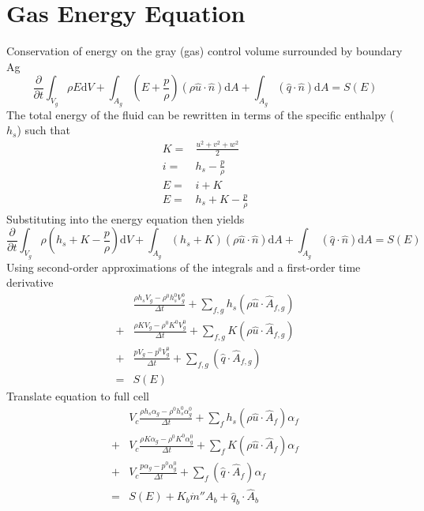 \documentclass{article}
\renewcommand{\vec}[1]{\ensuremath{\hat{#1}}}
\renewcommand{\d}{\mathrm{d}}
\begin{document}
  \section{Gas Energy Equation}
    Conservation of energy on the gray (gas) control volume surrounded by boundary Ag
    \begin{equation*}
        \frac{\partial}{\partial t}\int_{V_g} \rho E \d V
      + \int_{A_g} (E + \frac{p}{\rho}) (\rho \vec{u} \cdot \vec{n}) \d A
      + \int_{A_g} (\vec{q} \cdot \vec{n}) \d A
      = S(E)
    \end{equation*}
    The total energy of the fluid can be rewritten in terms of the specific enthalpy ($h_s$) such that
    \begin{align*}
      K =& \frac{u^2 + v^2 + w^2}{2} \\
      i =& h_s - \frac{p}{\rho} \\
      E =& i + K \\
      E =& h_s + K - \frac{p}{\rho}
    \end{align*}
    Substituting into the energy equation then yields
    \begin{equation*}
          \frac{\partial}{\partial t}\int_{V_g} \rho (h_s + K - \frac{p}{\rho}) \d V
        + \int_{A_g} (h_s + K) (\rho \vec{u} \cdot \vec{n}) \d A
        + \int_{A_g} (\vec{q} \cdot \vec{n}) \d A
        = S(E)
    \end{equation*}
    Using second-order approximations of the integrals and a first-order time derivative
    \begin{align*}
        &\frac{\rho h_s V_g - \rho^0 h_s^0 V_g^0}{\Delta t}
      + \sum_{f,g} h_s (\rho \vec{u}\cdot\vec{A}_{f,g}) \\
      + &\frac{\rho K V_g - \rho^0 K^0 V_g^0}{\Delta t}
      + \sum_{f,g} K (\rho \vec{u}\cdot\vec{A}_{f,g}) \\
      + &\frac{p V_g - p^0 V_g^0}{\Delta t}
      + \sum_{f,g} (\vec{q}\cdot\vec{A}_{f,g}) \\
      = & S(E)
    \end{align*}
    Translate equation to full cell
    \begin{align*}
        &V_c \frac{\rho h_s \alpha_g - \rho^0 h_s^0 \alpha_g^0}{\Delta t}
      + \sum_{f} h_s (\rho \vec{u}\cdot\vec{A}_{f}) \alpha_f \\
      + &V_c \frac{\rho K \alpha_g - \rho^0 K^0 \alpha_g^0}{\Delta t}
      + \sum_{f} K (\rho \vec{u}\cdot\vec{A}_{f}) \alpha_f \\
      + &V_c \frac{p \alpha_g - p^0 \alpha_g^0}{\Delta t}
      + \sum_{f} (\vec{q}\cdot\vec{A}_{f}) \alpha_f \\
      = & S(E)
      + K_b \dot{m}'' A_b
      + \vec{q}_b \cdot \vec{A}_b
    \end{align*}
\end{document}
